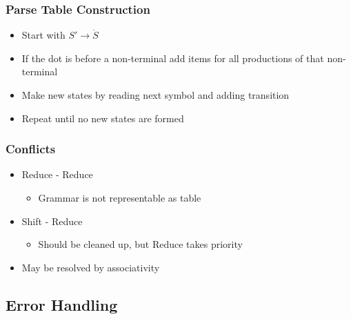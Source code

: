 \documentclass[usepdftitle=false,professionalfonts,compress ]{beamer}
\begin{document}
{
\begin{frame}\frametitle{Parse Table Construction}

	\begin{itemize}
	\item Start with $S' \rightarrow \dot S$
			\item If the dot is before a non-terminal  add items for all productions of that non-terminal
			\item Make new states by reading next symbol and adding transition
			\item Repeat until no new states are formed
				\end{itemize}

\end{frame}}






{
\begin{frame}\frametitle{Conflicts}

	\begin{itemize}
	\item Reduce - Reduce

	\begin{itemize}
	\item Grammar is not representable as table
				\end{itemize}

			\item Shift - Reduce

	\begin{itemize}
	\item Should be cleaned up, but Reduce takes priority
				\end{itemize}

			\item May be resolved by associativity
				\end{itemize}

\end{frame}}





\subsection{Error Handling}
\end{document}
